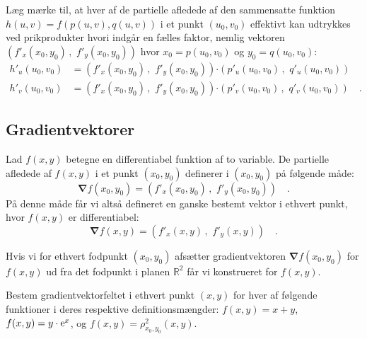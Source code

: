 \begin{aha}
Læg mærke til, at hver af de partielle afledede af den sammensatte funktion $h(u,v) = f(p(u,v), q(u,v))$ i et punkt $(u_{0}, v_{0})$ effektivt kan udtrykkes ved prikprodukter hvori indgår en fælles faktor, nemlig vektoren $\left(f'_{x}(x_{0}, y_{0})\, , \,\,f'_{y}(x_{0}, y_{0})\right)$ hvor $x_{0}= p(u_{0}, v_{0})$ og $y_{0}= q(u_{0}, v_{0})$:
\begin{equation*}
\begin{aligned}
h'_{u}(u_{0},v_{0}) &=  \left(f'_{x}(x_{0}, y_{0})\, , \,\, f'_{y}(x_{0}, y_{0})\right) \bm{\cdot} \left(p'_{u}(u_{0}, v_{0})\, , \,\,q'_{u}(u_{0}, v_{0})\right)\\
h'_{v}(u_{0},v_{0}) &=  \left(f'_{x}(x_{0}, y_{0})\, , \,\, f'_{y}(x_{0}, y_{0})\right) \bm{\cdot} \left(p'_{v}(u_{0}, v_{0})\, , \,\, q'_{v}(u_{0}, v_{0}) \right)\quad .
\end{aligned}
\end{equation*}
\end{aha}


\subsection{Gradientvektorer} \label{subsecGradientVec}

\begin{definition}[Gradientvektor]
Lad $f(x,y)$ betegne en differentiabel funktion af to variable. De partielle afledede af $f(x,y)$ i et punkt $(x_{0}, y_{0})$ definerer
 i $(x_{0}, y_{0})$ på følgende måde:
\begin{equation}
{\bm{\nabla}}f(x_{0}, y_{0}) = \left(f'_{x}(x_{0}, y_{0})\, , \, \, f'_{y}(x_{0}, y_{0}) \right) \quad .
\end{equation}
På denne måde får vi altså defineret en ganske bestemt vektor i ethvert punkt, hvor $f(x,y)$ er differentiabel:
\begin{equation}
{\bm{\nabla}}f(x,y) = \left(f'_{x}(x,y)\, , \, \, f'_{y}(x,y) \right) \quad .
\end{equation}
\end{definition}

Hvis vi for ethvert fodpunkt $(x_{0}, y_{0})$ afsætter gradientvektoren ${\bm{\nabla}}f(x_{0},y_{0})$ for $f(x,y)$ ud fra det fodpunkt i planen $\mathbb{R}^{2}$ får vi konstrueret  for $f(x,y)$.

\begin{exercise}
Bestem gradientvektorfeltet  i ethvert punkt $(x,y)$ for hver af følgende funktioner i deres respektive definitionsmængder:
$f(x,y) = x+y$, $f(x,y) = y\cdot\mathrm{e}^{x}$,  og $f(x,y) = \rho_{x_{0}, y_{0}}^{2}(x,y)$.
\end{exercise}

